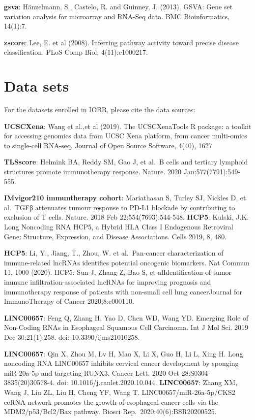 \documentclass[
  12pt,
]{book}
\begin{document}
\textbf{gsva}: Hänzelmann, S., Castelo, R. and Guinney, J. (2013). GSVA: Gene set variation analysis for microarray and RNA-Seq data. BMC Bioinformatics, 14(1):7.

\textbf{zscore}: Lee, E. et al (2008). Inferring pathway activity toward precise disease classification. PLoS Comp Biol, 4(11):e1000217.

\hypertarget{data-sets}{%
\section{Data sets}\label{data-sets}}

For the datasets enrolled in IOBR, please cite the data sources:

\textbf{UCSCXena}: Wang et al.,et al (2019). The UCSCXenaTools R package: a toolkit for accessing genomics data from UCSC Xena platform, from cancer multi-omics to single-cell RNA-seq. Journal of Open Source Software, 4(40), 1627

\textbf{TLSscore}: Helmink BA, Reddy SM, Gao J, et al.~B cells and tertiary lymphoid structures promote immunotherapy response. Nature. 2020 Jan;577(7791):549-555.

\textbf{IMvigor210 immuntherapy cohort}: Mariathasan S, Turley SJ, Nickles D, et al.~TGFβ attenuates tumour response to PD-L1 blockade by contributing to exclusion of T cells. Nature. 2018 Feb 22;554(7693):544-548.
\textbf{HCP5}: Kulski, J.K. Long Noncoding RNA HCP5, a Hybrid HLA Class I Endogenous Retroviral Gene: Structure, Expression, and Disease Associations. Cells 2019, 8, 480.

\textbf{HCP5}: Li, Y., Jiang, T., Zhou, W. et al.~Pan-cancer characterization of immune-related lncRNAs identifies potential oncogenic biomarkers. Nat Commun 11, 1000 (2020).
HCP5: Sun J, Zhang Z, Bao S, et alIdentification of tumor immune infiltration-associated lncRNAs for improving prognosis and immunotherapy response of patients with non-small cell lung cancerJournal for ImmunoTherapy of Cancer 2020;8:e000110.

\textbf{LINC00657}: Feng Q, Zhang H, Yao D, Chen WD, Wang YD. Emerging Role of Non-Coding RNAs in Esophageal Squamous Cell Carcinoma. Int J Mol Sci. 2019 Dec 30;21(1):258. doi: 10.3390/ijms21010258.

\textbf{LINC00657}: Qin X, Zhou M, Lv H, Mao X, Li X, Guo H, Li L, Xing H. Long noncoding RNA LINC00657 inhibits cervical cancer development by sponging miR-20a-5p and targeting RUNX3. Cancer Lett. 2020 Oct 28:S0304-3835(20)30578-4. doi: 10.1016/j.canlet.2020.10.044.
\textbf{LINC00657}: Zhang XM, Wang J, Liu ZL, Liu H, Cheng YF, Wang T. LINC00657/miR-26a-5p/CKS2 ceRNA network promotes the growth of esophageal cancer cells via the MDM2/p53/Bcl2/Bax pathway. Biosci Rep.~2020;40(6):BSR20200525.
\end{document}
